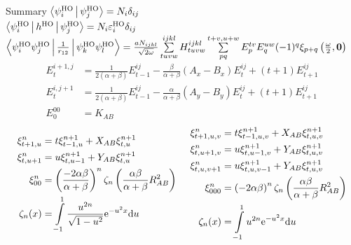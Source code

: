 \documentclass[10pt, t]{beamer}
\begin{document}
\begin{frame}[fragile]{Summary}
    \centering\footnotesize
    $\Braket{\psiHO_i|\psiHO_j} = N_i \delta_{ij}$ \\
    $\Braket{\psiHO_i|h^{\text{HO}}|\psiHO_j} =
    N_i\varepsilon^{\text{HO}}_i\delta_{ij}$ \\
    $\Braket{\psiHO_i\psiHO_j|\frac{1}{r_{12}}|\psiHO_k\psiHO_l} =
    \frac{aN_{ijkl}}{\sqrt{2\omega}}  \sum\limits^{ijkl}_{tuvw} H^{ijkl}_{tuvw}
    \suml{pq}{t+v,u+w} E^{tv}_pE^{uw}_q (-1)^q\xi_{p+q}\left(\frac{\omega}{2},
    \blds{0}\right)$
        \begin{equation*}
            \begin{aligned}
                E^{i+1,j}_t &= \frac{1}{2(\alpha + \beta)}E^{ij}_{t-1} -
                \frac{\beta}{\alpha+\beta}(A_x - B_x)E^{ij}_t +
                (t+1)E^{ij}_{t+1} \\
                E^{i,j+1}_t &= \frac{1}{2(\alpha + \beta)}E^{ij}_{t-1} -
                \frac{\alpha}{\alpha+\beta}(A_y - B_y)E^{ij}_t +
                (t+1)E^{ij}_{t+1} \\
                E^{00}_0 &= K_{AB}
            \end{aligned}
        \end{equation*}
        \begin{equation*}
            \begin{aligned}
                \xi^n_{t+1,u} &= t\xi^{n+1}_{t-1,u} + X_{AB}\xi^{n+1}_{t,u} \\
                \xi^n_{t,u+1} &= u\xi^{n+1}_{t,u-1} + Y_{AB}\xi^{n+1}_{t,u} \\
                \xi^n_{00} &= \left(\frac{-2\alpha\beta}{\alpha+\beta}\right)^n
                \zeta_n\left(\frac{\alpha\beta}{\alpha+\beta} R^2_{AB}\right) \\
                \zeta_n(x) &= \int\limits^1_{-1} \frac{u^{2n}}{\sqrt{1 -
                u^2}} \me^{-u^2x} \md u
            \end{aligned} \hspace{0.5cm}
            \begin{aligned}
                \xi^n_{t+1,u,v} &= t\xi^{n+1}_{t-1,u,v} + X_{AB}\xi^{n+1}_{t,u,v} \\
                \xi^n_{t,u+1,v} &= u\xi^{n+1}_{t,u-1,v} + Y_{AB}\xi^{n+1}_{t,u,v} \\
                \xi^n_{t,u,v+1} &= u\xi^{n+1}_{t,u,v-1} + Y_{AB}\xi^{n+1}_{t,u,v} \\
                \xi^n_{000} &= \left(-2\alpha\beta\right)^n
                \zeta_n\left(\frac{\alpha\beta}{\alpha+\beta} R^2_{AB}\right)
                \\
                \zeta_n(x) &= \int\limits^1_{-1} u^{2n} \me^{-u^2x} \md u
            \end{aligned}
        \end{equation*}
\end{frame}
\end{document}
